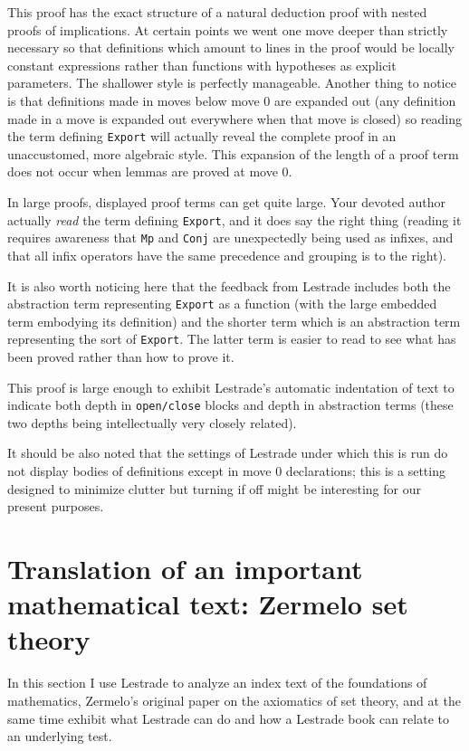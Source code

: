 \documentclass[12pt]{article}
\begin{document}
This proof has the exact structure of a natural deduction proof with nested proofs of implications.  At certain points
we went one move deeper than strictly necessary so that definitions which amount to lines in the proof would be
locally constant expressions rather than functions with hypotheses as explicit parameters.  The shallower style is perfectly manageable.  Another thing to notice is that definitions made in moves below move 0 are expanded out (any definition made in a move is expanded out everywhere when that move is closed) so reading the term defining {\tt Export}
will actually reveal the complete proof in an unaccustomed, more algebraic style.  This expansion of the length of
a proof term does not occur when lemmas are proved at move 0.

In large proofs, displayed proof terms can get quite large.  Your devoted author actually {\em read\/} the term
defining {\tt Export}, and it does say the right thing (reading it requires awareness that {\tt Mp} and {\tt Conj} are unexpectedly being used as infixes, and that all infix operators have the same precedence and grouping is to the right).

It is also worth noticing here that the feedback from Lestrade includes both the abstraction term representing {\tt Export} as a function (with the large embedded term embodying its definition) and the shorter term which is an abstraction term representing the sort of {\tt Export}.  The latter term is easier to read to see what has been proved rather than how to prove it.

This proof is large enough to exhibit Lestrade's automatic indentation of text to indicate both depth in {\tt open/close} blocks and depth in abstraction terms (these two depths being intellectually very closely related).

It should be also noted that the settings of Lestrade under which this is run do not display bodies of definitions
except in move 0 declarations;  this is a setting designed to minimize clutter but turning if off might be interesting for our present purposes.

\newpage

\section{Translation of an important mathematical text:  Zermelo set theory}

In this section I use Lestrade to analyze an index text of the foundations of mathematics, Zermelo's original
paper on the axiomatics of set theory, and at the same time exhibit what Lestrade can do and how a Lestrade book
can relate to an underlying test.
\end{document}

